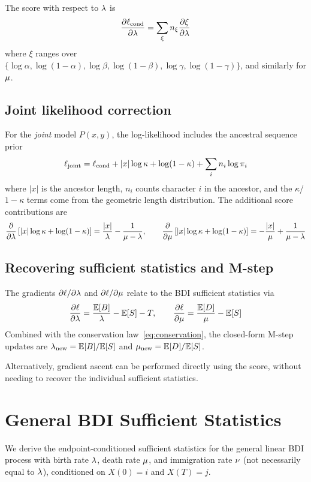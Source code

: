 The score with respect to $\lambda$ is
\[
\frac{\partial \ell_{\text{cond}}}{\partial \lambda}
= \sum_{\xi} n_\xi \frac{\partial \xi}{\partial \lambda}
\]
where $\xi$ ranges over $\{\log\alpha, \log(1-\alpha), \log\beta, \log(1-\beta), \log\gamma, \log(1-\gamma)\}$,
and similarly for $\mu$.

\subsection{Joint likelihood correction}

For the \emph{joint} model $P(x,y)$, the log-likelihood includes the ancestral sequence prior
\[
\ell_{\text{joint}} = \ell_{\text{cond}} + |x|\log\kappa + \log(1-\kappa) + \sum_i n_i\log\pi_i
\]
where $|x|$ is the ancestor length, $n_i$ counts character $i$ in the ancestor,
and the $\kappa$/$1-\kappa$ terms come from the geometric length distribution.
The additional score contributions are
\[
\frac{\partial}{\partial \lambda}\left[|x|\log\kappa + \log(1-\kappa)\right]
= \frac{|x|}{\lambda} - \frac{1}{\mu - \lambda}, \qquad
\frac{\partial}{\partial \mu}\left[|x|\log\kappa + \log(1-\kappa)\right]
= -\frac{|x|}{\mu} + \frac{1}{\mu - \lambda}
\]

\subsection{Recovering sufficient statistics and M-step}

The gradients $\partial\ell/\partial\lambda$ and $\partial\ell/\partial\mu$
relate to the BDI sufficient statistics via
\[
\frac{\partial\ell}{\partial\lambda} = \frac{\mathbb{E}[B]}{\lambda} - \mathbb{E}[S] - T, \qquad
\frac{\partial\ell}{\partial\mu} = \frac{\mathbb{E}[D]}{\mu} - \mathbb{E}[S]
\]
Combined with the conservation law~\eqref{eq:conservation},
the closed-form M-step updates are
$\lambda_{\text{new}} = \mathbb{E}[B]/\mathbb{E}[S]$ and
$\mu_{\text{new}} = \mathbb{E}[D]/\mathbb{E}[S]$.

Alternatively, gradient ascent can be performed directly using the score,
without needing to recover the individual sufficient statistics.


\section{General BDI Sufficient Statistics}
\label{sec:appendix-bdi}

We derive the endpoint-conditioned sufficient statistics for the general linear BDI process
with birth rate $\lambda$, death rate $\mu$, and immigration rate $\nu$
(not necessarily equal to $\lambda$), conditioned on $X(0) = i$ and $X(T) = j$.

